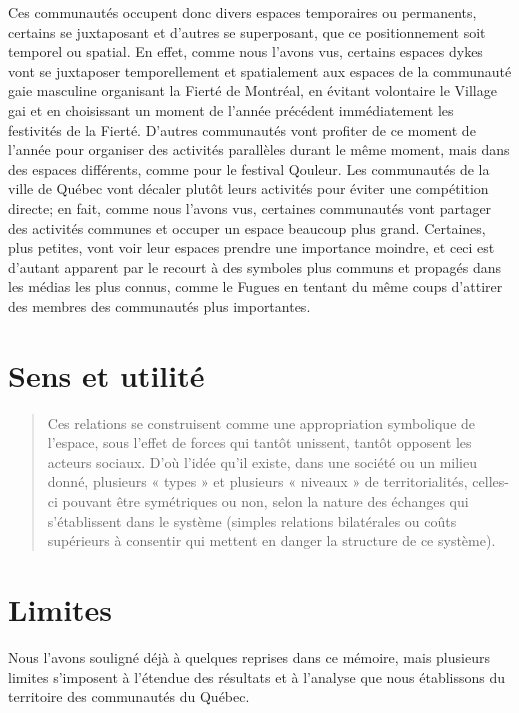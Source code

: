 Ces communautés occupent donc divers espaces temporaires ou permanents, certains se juxtaposant et d'autres se superposant, que ce positionnement soit temporel ou spatial.
En effet, comme nous l'avons vus, certains espaces dykes vont se juxtaposer temporellement et spatialement aux espaces de la communauté gaie masculine organisant la Fierté de Montréal, en évitant volontaire le Village gai et en choisissant un moment de l'année précédent immédiatement les festivités de la Fierté.
D'autres communautés vont profiter de ce moment de l'année pour organiser des activités parallèles durant le même moment, mais dans des espaces différents, comme pour le festival Qouleur.
Les communautés de la ville de Québec vont décaler plutôt leurs activités pour éviter une compétition directe; en fait, comme nous l'avons vus, certaines communautés vont partager des activités communes et occuper un espace beaucoup plus grand.
Certaines, plus petites, vont voir leur espaces prendre une importance moindre, et ceci est d'autant apparent par le recourt à des symboles plus communs et propagés dans les médias les plus connus, comme le Fugues en tentant du même coups d'attirer des membres des communautés plus importantes.

\section*{Sens et utilité}
\label{sec:sens_et_utilit_}

\begin{quotation}
  Ces relations se construisent comme une appropriation symbolique de l'espace, sous l'effet de forces qui tantôt unissent, tantôt opposent les acteurs sociaux.
  D'où l'idée qu'il existe, dans une société ou un milieu donné, plusieurs « types » et plusieurs « niveaux » de territorialités, celles-ci pouvant être symétriques ou non, selon la nature des échanges qui s'établissent dans le système (simples relations bilatérales ou coûts supérieurs à consentir qui mettent en danger la structure de ce système).\citep[41]{Courville1991}
\end{quotation}

\section{Limites}
\label{sec:limites}

Nous l'avons souligné déjà à quelques reprises dans ce mémoire, mais plusieurs limites s'imposent à l'étendue des résultats et à l'analyse que nous établissons du territoire des communautés \lgbt{} du Québec.

